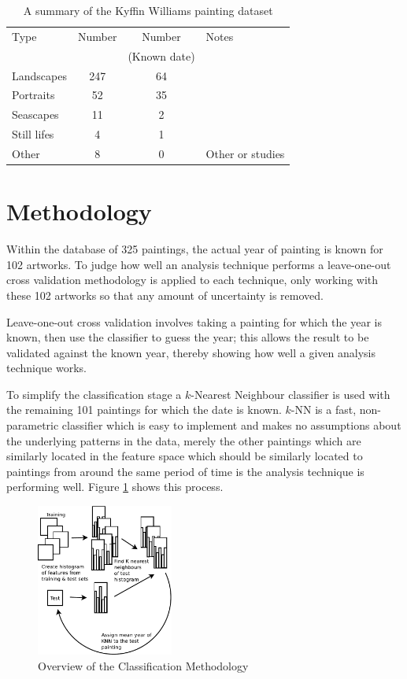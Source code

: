 \begin{table}[h]
\centering
\begin{tabular}{| l | c | c | p{3cm} |}
\hline
Type & Number & Number & Notes \\
  & & (Known date) &  \\
\hline
Landscapes  & 247 & 64 & \\
Portraits   &  52 & 35 & \\
Seascapes   &  11 &  2 & \\
Still lifes &   4 &  1 & \\
Other       &   8 &  0 & Other or studies \\
\hline
\end{tabular}
\caption{A summary of the Kyffin Williams painting dataset
\label{summary_t}}
\end{table}

\section{Methodology}

Within the database of 325 paintings, the actual year of painting is known for 102 artworks. 
To judge how well an analysis technique performs a leave-one-out cross validation methodology is
applied to each technique, only working with these 102 artworks so that any amount of uncertainty 
is removed.

Leave-one-out cross validation involves taking a painting for which the year is known, then use
the classifier to guess the year; this allows the result to be validated against the known year,
thereby showing how well a given analysis technique works.

To simplify the classification stage a $k$-Nearest Neighbour classifier is used with the remaining
101 paintings for which the date is known. $k$-NN is a fast, non-parametric classifier
which is easy to implement and makes no assumptions about the underlying patterns in the data, 
merely the other paintings which are similarly located in the feature space which should be 
similarly located to paintings from around the same period of time is the analysis technique is
performing well. Figure \ref{img:classification-overview} shows this process.

\begin{figure}[h]
\centering
\includegraphics[width=0.4\textwidth]{img/kyffin_overview.pdf}
\caption{Overview of the Classification Methodology}
\label{img:classification-overview}
\end{figure}


